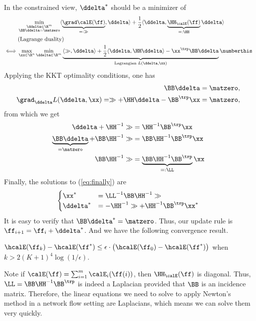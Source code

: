 In the constrained view, $\ddelta^*$ should be a minimizer of
\begin{align*}
  & \min_{\begin{subarray}{c} \ddelta\in\R^m \\ \BB\ddelta=\matzero \end{subarray}} \langle \underbrace{\grad\calE(\ff)}_{=:\gg},\ddelta\rangle + \frac{1}{2}\langle\ddelta,\underbrace{\HH_{\calE}(\ff)}_{=:\HH} \ddelta\rangle \\
  & \text{(Lagrange duality)} \\
  \iff & \max_{\xx\in\R^n} \min_{\ddelta\in\R^m} \underbrace{\langle\gg,\ddelta\rangle + \frac{1}{2}\langle\ddelta,\HH\ddelta\rangle - \xx^\trp\BB\ddelta}_{\text{Lagrangian } L(\ddelta,\xx)} \numberthis \label{eq:finally}
\end{align*}
Applying the KKT optimality conditions, one has
\begin{align*}
  \BB\ddelta = \matzero, \\
  \grad_{\ddelta} L(\ddelta,\xx) = \gg+ \HH\ddelta - \BB^\trp\xx = \matzero,
\end{align*}
from which we get
\begin{align*}
  \ddelta + \HH^{-1}\gg &= \HH^{-1}\BB^\trp\xx \\
  \underbrace{\BB\ddelta}_{=\matzero} + \BB\HH^{-1}\gg  &= \BB\HH^{-1}\BB^\trp\xx \\
  \BB\HH^{-1}\gg  &= \underbrace{\BB\HH^{-1}\BB^\trp}_{=:\LL}\xx
\end{align*}
Finally, the solutions to (\ref{eq:finally}) are
\[\begin{cases}
  \xx^* &= \LL^{-1}\BB\HH^{-1}\gg \\
  \ddelta^* &= -\HH^{-1}\gg + \HH^{-1}\BB^\trp\xx^*
\end{cases}\]
It is easy to verify that $\BB\ddelta^* = \matzero$. Thus, our update rule is $\ff_{i+1} = \ff_{i} + \ddelta^*$. And we have the following convergence result.
\begin{theorem}
  $\hcalE(\ff_k)-\hcalE(\ff^*) \leq \epsilon \cdot \big(\hcalE(\ff_0)-\hcalE(\ff^*)\big)$ when $k>2(K+1)^4\log(1/\epsilon)$.
\end{theorem}

\begin{remark}
  Note if $\calE(\ff) = \sum_{i=1}^{m} \calE_{i}(\ff(i))$, then
  $\HH_{\calE}(\ff)$ is diagonal. Thus, $\LL=\BB\HH^{-1}\BB^\trp$ is
  indeed a Laplacian provided that $\BB$ is an incidence matrix.
  Therefore, the linear equations we need to solve to apply
  Newton's method in a network flow setting are Laplacians, which
  means we can solve them very quickly.
\end{remark}


%

